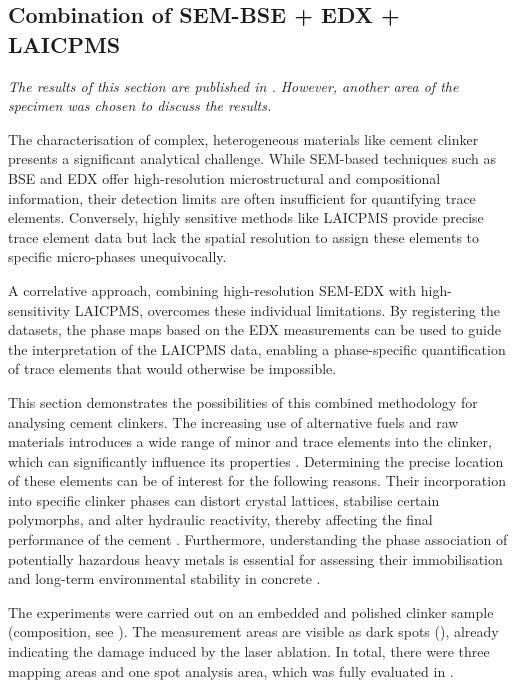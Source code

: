 \newpage
\subsection{Combination of \acs*{SEM}-\acs*{BSE} + \acs*{EDX} + \acs*{LAICPMS}}
\label{sec:corr_laicpms}

\textit{The results of this section are published in \cite{kleiner.2022b}. However, another area of the specimen was chosen to discuss the results.}

The characterisation of complex, heterogeneous materials like cement clinker presents a significant analytical challenge.
While \ac{SEM}-based techniques such as \ac{BSE} and \ac{EDX} offer high-resolution microstructural and compositional information, their detection limits are often insufficient for quantifying trace elements.
Conversely, highly sensitive methods like \ac{LAICPMS} provide precise trace element data but lack the spatial resolution to assign these elements to specific micro-phases unequivocally.

A correlative approach, combining high-resolution \ac{SEM}-\ac{EDX} with high-sensitivity \ac{LAICPMS}, overcomes these individual limitations.
By registering the datasets, the phase maps based on the \ac{EDX} measurements can be used to guide the interpretation of the \ac{LAICPMS} data, enabling a phase-specific quantification of trace elements that would otherwise be impossible.

This section demonstrates the possibilities of this combined methodology for analysing cement clinkers.
The increasing use of alternative fuels and raw materials introduces a wide range of minor and trace elements into the clinker, which can significantly influence its properties \cite{schneider.2015, stephan.1999, barros.2004, thiery.2025}.
Determining the precise location of these elements can be of interest for the following reasons.
Their incorporation into specific clinker phases can distort crystal lattices, stabilise certain polymorphs, and alter hydraulic reactivity, thereby affecting the final performance of the cement \cite{stephan.1999, barros.2004, stephan.2006, ludwig.2015}.
Furthermore, understanding the phase association of potentially hazardous heavy metals is essential for assessing their immobilisation and long-term environmental stability in concrete \cite{achternbosch.2003, kolovos.2002}.

The experiments were carried out on an embedded and polished clinker sample (composition, see ).
The measurement areas are visible as dark spots (), already indicating the damage induced by the laser ablation.
In total, there were three mapping areas and one spot analysis area, which was fully evaluated in \cite{kleiner.2022b}.

